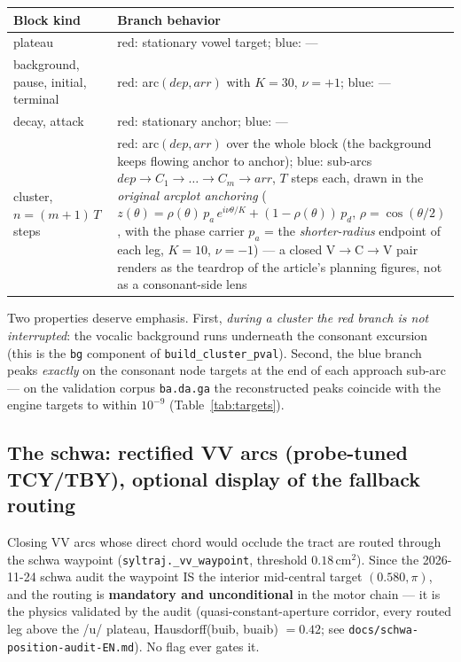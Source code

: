 \documentclass[11pt,a4paper]{article}
\newcommand{\code}[1]{\texttt{#1}}
\begin{document}
\begin{center}
\begin{tabularx}{\textwidth}{@{}>{\raggedright\arraybackslash}p{}X@{}}
\toprule
\textbf{Block kind} & \textbf{Branch behavior} \\
\midrule
plateau & red: stationary vowel target; blue: --- \\
background, pause, initial, terminal &
red: arc$(\mathit{dep}, \mathit{arr})$ with $K{=}30$, $\nu{=}{+}1$;
blue: --- \\
decay, attack & red: stationary anchor; blue: --- \\
cluster, $n = (m{+}1)\,T$ steps &
red: arc$(\mathit{dep}, \mathit{arr})$ over the whole block (the
background keeps flowing anchor to anchor); blue: sub-arcs
$\mathit{dep} \to C_1 \to \dots \to C_m \to \mathit{arr}$, $T$ steps
each, drawn in the \emph{original arcplot anchoring}
($z(\theta) = \rho(\theta)\,p_a\,e^{i\nu\theta/K} +
(1{-}\rho(\theta))\,p_d$, $\rho = \cos(\theta/2)$, with the phase
carrier $p_a$ = the \emph{shorter-radius} endpoint of each leg,
$K{=}10$, $\nu{=}{-}1$) --- a closed V$\to$C$\to$V pair renders as
the teardrop of the article's planning figures, not as a
consonant-side lens \\
\bottomrule
\end{tabularx}
\end{center}

Two properties deserve emphasis. First, \emph{during a cluster the
red branch is not interrupted}: the vocalic background runs
underneath the consonant excursion (this is the \code{bg} component
of \code{build\_cluster\_pval}). Second, the blue branch peaks
\emph{exactly} on the consonant node targets at the end of each
approach sub-arc --- on the validation corpus \code{ba.da.ga} the
reconstructed peaks coincide with the engine targets to within
$10^{-9}$ (Table~\ref{tab:targets}).

\subsection{The schwa: rectified VV arcs (probe-tuned TCY/TBY), optional display of the fallback routing}
\label{sec:schwa-toggle}

Closing VV arcs whose direct chord would occlude the tract are routed
through the schwa waypoint (\code{syltraj.\_vv\_waypoint}, threshold
$0.18\,\mathrm{cm^2}$). Since the 2026-11-24 schwa audit the waypoint
IS the interior mid-central target $(0.580, \pi)$, and the routing is
\textbf{mandatory and unconditional} in the motor chain --- it is the
physics validated by the audit (quasi-constant-aperture corridor, every
routed leg above the /u/ plateau, Hausdorff(buib, buaib) $= 0.42$;
see \code{docs/schwa-position-audit-EN.md}). No flag ever gates it.
\end{document}
